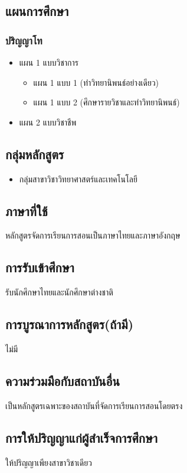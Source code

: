 \subsection{แผนการศึกษา}
\subsubsection*{ปริญญาโท}
\begin{itemize}
	\item แผน 1 แบบวิชาการ
		\begin{itemize}
		\item แผน 1 แบบ 1 (ทำวิทยานิพนธ์อย่างเดียว)
		\item แผน 1 แบบ 2 (ศึกษารายวิชาและทำวิทยานิพนธ์)
		\end{itemize}
	\item แผน 2 แบบวิชาชีพ
\end{itemize}

\subsection{กลุ่มหลักสูตร}
\begin{itemize}
	\item กลุ่มสาขาวิชาวิทยาศาสตร์และเทคโนโลยี
\end{itemize}


\subsection{ภาษาที่ใช้}
หลักสูตรจัดการเรียนการสอนเป็นภาษาไทยและภาษาอังกฤษ

\subsection{การรับเข้าศึกษา}
รับนักศึกษาไทยและนักศึกษาต่างชาติ

\subsection{การบูรณาการหลักสูตร(ถ้ามี)}
ไม่มี

\subsection{ความร่วมมือกับสถาบันอื่น}
เป็นหลักสูตรเฉพาะของสถาบันที่จัดการเรียนการสอนโดยตรง

\subsection{การให้ปริญญาแก่ผู้สำเร็จการศึกษา}
ให้ปริญญาเพียงสาขาวิชาเดียว

